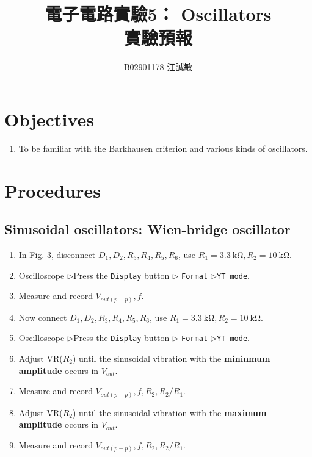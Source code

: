 \documentclass[12pt, a4paper]{article}
\title{ \bf {\huge 電子電路實驗5： Oscillators}\\ 實驗預報}
\author{B02901178 江誠敏}
\newcommand{\tri}{$\rhd$}
\begin{document}
\maketitle

\section{Objectives}
\begin{enumerate}
  \item To be familiar with the Barkhausen criterion
     and various kinds of oscillators.   
\end{enumerate}


\section{Procedures}
\subsection{Sinusoidal oscillators: Wien-bridge oscillator}
\begin{enumerate}[itemsep=0pt]
  \item In Fig. 3, disconnect $D_1, D_2, R_3, R_4, R_5, R_6$,
    use $R_1 = \SI{3.3}\kohm, R_2 = \SI{10}\kohm$.
  \item Oscilloscope \tri Press the \texttt{Display} button \tri 
    \texttt{Format} \tri \texttt{YT mode}.
  \item Measure and record $V_{out(p-p)}, f$.
  \item Now connect $D_1, D_2, R_3, R_4, R_5, R_6$,
    use $R_1 = \SI{3.3}\kohm, R_2 = \SI{10}\kohm$.
  \item Oscilloscope \tri Press the \texttt{Display} button \tri 
    \texttt{Format} \tri \texttt{YT mode}.
  \item Adjust VR($R_2$) until the sinusoidal vibration with the
    {\bf mininmum amplitude} occurs in $V_{out}$.
  \item Measure and record $V_{out(p-p)}, f, R_2, R_2/R_1$.
  \item Adjust VR($R_2$) until the sinusoidal vibration with the
    {\bf maximum amplitude} occurs in $V_{out}$.
  \item Measure and record $V_{out(p-p)}, f, R_2, R_2/R_1$.
\end{enumerate}
\end{document}

